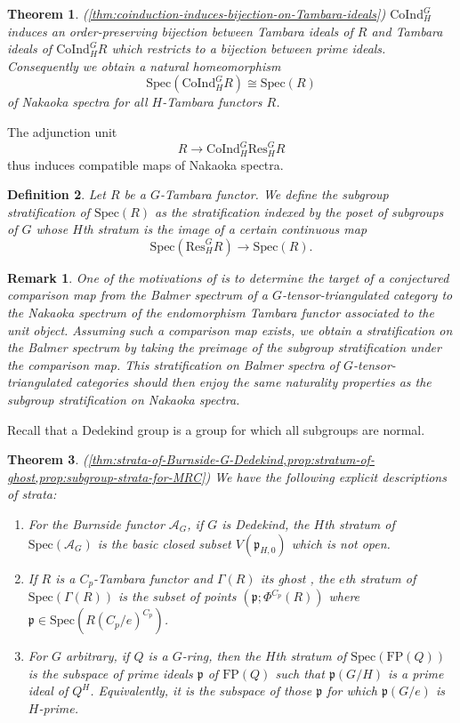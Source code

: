 \documentclass[11pt,dvipsnames]{amsart}
\newcommand{\A}{\mathcal{A}}
\newcommand{\p}{\mathfrak{p}}
\newtheorem{letterthm}{Theorem}
\theoremstyle{BoldRemark}
\newtheorem{remark}[theorem]{Remark}
\newtheorem{letterdef}[letterthm]{Definition}
\newcommand{\Res}{\mathrm{Res}}
\newcommand{\Spec}{\mathrm{Spec}}
\newcommand{\Coind}{\mathrm{CoInd}}
\newcommand{\FP}{\mathrm{FP}}
\newcommand{\ghost}{\Gamma}
\begin{document}
\begin{letterthm}(\cref{thm:coinduction-induces-bijection-on-Tambara-ideals})
    $\Coind_H^G$ induces an order-preserving bijection between Tambara ideals of $R$ and Tambara ideals of $\Coind_H^G R$ which restricts to a bijection between prime ideals. Consequently we obtain a natural homeomorphism
    \[ 
        \Spec(\Coind_H^G R) \cong \Spec(R) 
    \] 
    of Nakaoka spectra for all $H$-Tambara functors $R$.
\end{letterthm}

The adjunction unit 
\[ 
    R \rightarrow \Coind_H^G \Res_H^G R 
\] 
thus induces compatible maps of Nakaoka spectra.

\begin{letterdef}
    Let $R$ be a $G$-Tambara functor. We define the \emph{subgroup stratification} of $\Spec(R)$ as the stratification indexed by the poset of subgroups of $G$ whose $H$th stratum is the image of a certain continuous map
    \[ 
        \Spec(\Res_H^G R) \rightarrow \Spec(R) .
    \] 
\end{letterdef}

\begin{remark}
    One of the motivations of \cite{4DSC} is to determine the target of a conjectured comparison map from the Balmer spectrum of a $G$-tensor-triangulated category to the Nakaoka spectrum of the endomorphism Tambara functor associated to the unit object. Assuming such a comparison map exists, we obtain a stratification on the Balmer spectrum by taking the preimage of the subgroup stratification under the comparison map. This stratification on Balmer spectra of $G$-tensor-triangulated categories should then enjoy the same naturality properties as the subgroup stratification on Nakaoka spectra.
\end{remark}

Recall that a Dedekind group is a group for which all subgroups are normal.

\begin{letterthm}(\cref{thm:strata-of-Burnside-G-Dedekind,prop:stratum-of-ghost,prop:subgroup-strata-for-MRC})
    We have the following explicit descriptions of strata: 
    \begin{enumerate}
        \item For the Burnside functor $\A_G$, if $G$ is Dedekind, the $H$th stratum of $\Spec(\A_G)$ is the basic closed subset $V(\p_{H,0})$ which is not open.
        \item If $R$ is a $C_p$-Tambara functor and $\ghost(R)$ its ghost \cite[Definition 7.3]{4DS}, the $e$th stratum of $\Spec(\ghost(R))$ is the subset of points $(\p;\Phi^{C_p}(R))$ where $\p \in \Spec(R(C_p/e)^{C_p})$.
        \item For $G$ arbitrary, if $Q$ is a $G$-ring, then the $H$th stratum of $\Spec(\FP(Q))$ is the subspace of prime ideals $\p$ of $\FP(Q)$ such that $\p(G/H)$ is a prime ideal of $Q^H$. Equivalently, it is the subspace of those $\p$ for which $\p(G/e)$ is $H$-prime.
    \end{enumerate}
\end{letterthm}
\end{document}
